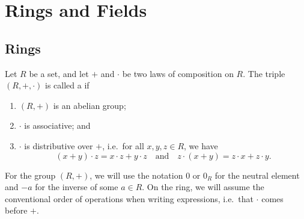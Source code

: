 \chapter{Rings and Fields}

\section{Rings}

\begin{defn}
Let $ R $ be a set, and let $ + $ and $ \cdot $ be two laws of composition on $ R $. The triple $ (R,+,\cdot) $ is called a  if
\begin{enumerate}
    \item $ (R,+) $ is an abelian group;
    \item $ \cdot $ is associative; and
    \item $ \cdot $ is distributive over $ + $, i.e.\ for all $ x,y,z\in R $, we have
    \begin{equation*}
        (x+y)\cdot z=x\cdot z+y\cdot z \quad\text{and}\quad z\cdot(x+y)=z\cdot x+z\cdot y.
    \end{equation*}
\end{enumerate}
\end{defn}

For the group $ (R,+) $, we will use the notation $ 0 $ or $ 0_R $ for the neutral element and $ -a $ for the inverse of some $ a\in R $. On the ring, we will assume the conventional order of operations when writing expressions, i.e.\ that $ \cdot $ comes before $ + $.


